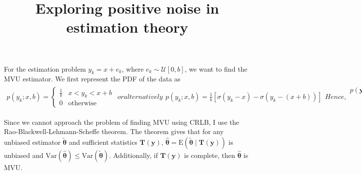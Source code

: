 \documentclass{article}
\title{Exploring positive noise in estimation theory}
\author{
}
\newcommand{\E}{\mathrm{E}}
\newcommand{\Var}{\mathrm{Var}}
\begin{document}
For the estimation problem $y_k=x+e_k$, where $e_k\sim\mathcal{U}[0,b]$, we want to find the MVU estimator. We first represent the PDF of the data as
%
%
\begin{subequations}
\begin{align}
p(y_k;x,b) = \left\{\begin{matrix}
\frac{1}{b} & x<y_k<x+b \\ 
0 & \mathrm{otherwise} 
\end{matrix}\right.	
\end{align}
%
%
or alternatively
\begin{align}
p(y_k;x,b) = \frac{1}{b}\left[\sigma(y_k-x) - \sigma(y_k-(x+b))\right]
\end{align}
%
%
Hence,
%
\begin{align}
p(\bm{y};x,b) &= \frac{1}{b^N}\prod_{k=1}^{N}\left[\sigma(y_k-x) - \sigma(y_k-x-b)\right]\nonumber\\
&=\frac{1}{b^N}\left[\sigma(\min y_k -x) - \sigma(\max y_k -x -b)\right]%
\label{eq:unknown}
\end{align}
%
%
%
%	
\end{subequations}	

Since we cannot approach the problem of finding MVU using CRLB, I use the Rao-Blackwell-Lehmann-Scheffe theorem. The theorem gives that for any unbiased estimator $\tilde{\bm{\theta}}$ and sufficient statistics $\bm{T}(\bm{y})$, $\hat{\bm{\theta}}=\E(\tilde{\bm{\theta}}\mid\bm{T}(\bm{y}))$ is unbiased and $\Var(\hat{\bm{\theta}})\leq\Var(\tilde{\bm{\theta}})$. Additionally, if $\bm{T}(\bm{y})$ is complete, then $\hat{\bm{\theta}}$ is MVU.
\end{document}
